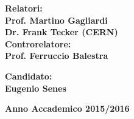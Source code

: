 \begin{titlepage}
\begin{minipage}[t]{0.47\textwidth}
{\large{\bf Relatori:\\
Prof. Martino Gagliardi \\
Dr. Frank Tecker (CERN)}}
\vspace{8mm}
{\large{\bf \\ Controrelatore:\\
Prof. Ferruccio Balestra}}
\end{minipage}
\hfill
\begin{minipage}[t]{0.47\textwidth}\raggedleft
\vspace{20mm}
{\large{\bf Candidato:\\
Eugenio Senes}}
\end{minipage}
\vspace{10mm}
\begin{center}
{\large{\bf 
Anno Accademico 2015/2016}}
\end{center}

\end{titlepage}